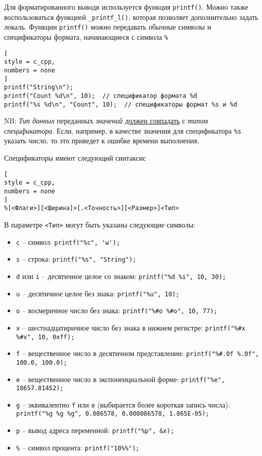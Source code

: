 \documentclass[%
	11pt,
	a4paper,
	utf8,
		]{article}
\begin{document}
Для форматированного выводв используется функция \verb*|printf()|. Можно также воспользоваться функцией \verb|_printf_l()|, которая позволяет дополнительно задать локаль. Функции \verb*|printf()| можно передавать обычные символы и спецификаторы формата, начинающиеся с символа \verb|%|
\begin{lstlisting}[
style = c_cpp,
numbers = none	
]
printf("String\n");
printf("Count %d\n", 10);  // спецификатор формата %d
printf("%s %d\n", "Count", 10);  // спецификаторы формат %s и %d
\end{lstlisting}

NB: \emph{Тип данных} переданных \emph{значений} \underline{должен совпадать} с \emph{типом спецификатора}. Если, например, в качестве значения для спецификатора \verb*|%s| указать число, то это приведет к ошибке времени выполнения.

Спецификаторы имеют следующий синтаксис \cite[]{prokhorenok-prog-c:2020}
\begin{lstlisting}[
style = c_cpp,
numbers = none
]
%[<Флаги>][<Ширина]>[.<Точность>][<Размер>]<Тип>
\end{lstlisting}

В параметре \verb|<Тип>| могут быть указаны следующие символы:
\begin{itemize}
	\item \verb*|c| -- символ: \verb|printf("%c", 'w');|
	
	\item \verb*|s| -- строка: \verb|printf("%s", "String");|
	
	\item \verb*|d| или \verb|i| -- десятичное целое со знаком: \verb|printf("%d %i", 10, 30);|
	
	\item \verb|u| -- десятичное целое без знака: \verb|printf("%u", 10);|
	
	\item \verb|o| -- восмеричное число без знака: \verb|printf("%#o %#o", 10, 77);|
	
	\item \verb|x| -- шестнадцатиричное число без знака в нижнем регистре: \verb|printf("%#x %#x", 10, 0xff);|
	
	\item \verb|f| -- вещественное число в десятичном представлении: \verb|printf("%#.0f %.0f", 100.0, 100.0);|
	
	\item \verb*|e| -- вещественное число в экспоненциальной форме: \verb|printf("%e", 18657.81452);|
	
	\item \verb|g| -- эквивалентно \verb*|f| или \verb|e| (выбирается более короткая запись числа):\\ \verb|printf("%g %g %g", 0.086578, 0.000086578, 1.865E-05);|
	
	\item \verb|p| -- вывод адреса переменной: \verb|printf("%p", &x);|
	
	\item \verb*|%| -- символ процента: \verb|printf("10%%");|
\end{itemize}
\end{document}
